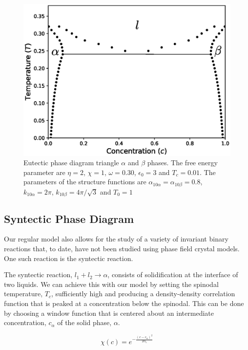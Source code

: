 \documentclass[showkeys, prb, reprint]{revtex4-1}
\newcommand{\f}{\frac}
\begin{document}
\begin{figure}
	\includegraphics[scale=0.5]{eutectic}
	\caption{\label{eutectic} Eutectic phase diagram triangle $\alpha$ and $\beta$ phases. The free energy parameter are $\eta = 2$, $\chi = 1$, $\omega=0.30$, $\epsilon_0 = 3$ and $T_c = 0.01$. The parameters of the structure functions are $\alpha_{10\alpha} = \alpha_{10\beta} = 0.8$, $k_{10\alpha} = 2\pi$, $k_{10\beta} = 4\pi/\sqrt{3}$ and $T_0 = 1$}
\end{figure}


\subsection{Syntectic Phase Diagram}

Our regular model also allows for the study of a variety of invariant binary reactions that, to date, have not been studied using phase field crystal models. One such reaction is the syntectic reaction. 

The syntectic reaction, $l_1 + l_2 \rightarrow \alpha $, consists of solidification at the interface of two liquids. We can achieve this with our model by setting the spinodal temperature, $T_c$, sufficiently high and producing a density-density correlation function that is peaked at a concentration below the spinodal. This can be done by choosing a window function that is centered about an intermediate concentration, $c_\alpha$ of the solid phase, $\alpha$. 

\begin{equation}
  \chi(c) = e^{- \f{(c - c_\alpha)^2}{2 \alpha_c}}
\end{equation}
\end{document}
